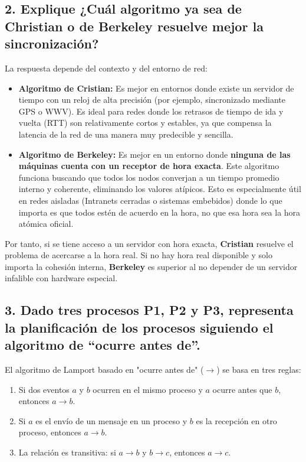 \documentclass{article}
\begin{document}
\subsection{2. Explique ¿Cuál algoritmo ya sea de Christian o de Berkeley resuelve mejor la sincronización?}
La respuesta depende del contexto y del entorno de red:
\begin{itemize}
    \item \textbf{Algoritmo de Cristian:} Es mejor en entornos donde existe un servidor de tiempo con un reloj de alta precisión (por ejemplo, sincronizado mediante GPS o WWV). Es ideal para redes donde los retrasos de tiempo de ida y vuelta (RTT) son relativamente cortos y estables, ya que compensa la latencia de la red de una manera muy predecible y sencilla.
    \item \textbf{Algoritmo de Berkeley:} Es mejor en un entorno donde \textbf{ninguna de las máquinas cuenta con un receptor de hora exacta}. Este algoritmo funciona buscando que todos los nodos converjan a un tiempo promedio interno y coherente, eliminando los valores atípicos. Esto es especialmente útil en redes aisladas (Intranets cerradas o sistemas embebidos) donde lo que importa es que todos estén de acuerdo en la hora, no que esa hora sea la hora atómica oficial.
\end{itemize}
Por tanto, si se tiene acceso a un servidor con hora exacta, \textbf{Cristian} resuelve el problema de acercarse a la hora real. Si no hay hora real disponible y solo importa la cohesión interna, \textbf{Berkeley} es superior al no depender de un servidor infalible con hardware especial.

\subsection{3. Dado tres procesos P1, P2 y P3, representa la planificación de los procesos siguiendo el algoritmo de ``ocurre antes de''.}
El algoritmo de Lamport basado en "ocurre antes de" ($\rightarrow$) se basa en tres reglas:
\begin{enumerate}
    \item Si dos eventos $a$ y $b$ ocurren en el mismo proceso y $a$ ocurre antes que $b$, entonces $a \rightarrow b$.
    \item Si $a$ es el envío de un mensaje en un proceso y $b$ es la recepción en otro proceso, entonces $a \rightarrow b$.
    \item La relación es transitiva: si $a \rightarrow b$ y $b \rightarrow c$, entonces $a \rightarrow c$.
\end{enumerate}
\end{document}
